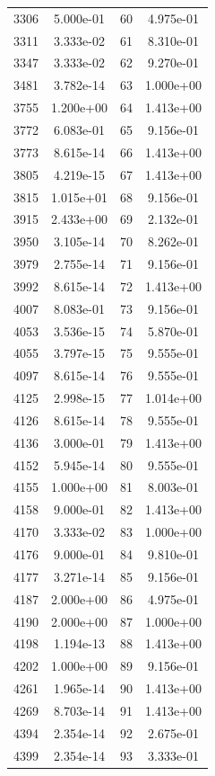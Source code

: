 \documentclass[12pt]{article}
\begin{document}
\begin{longtable}{@{}cccc@{}}
3306 & 5.000e-01 & 60 & 4.975e-01 \\
3311 & 3.333e-02 & 61 & 8.310e-01 \\
3347 & 3.333e-02 & 62 & 9.270e-01 \\
3481 & 3.782e-14 & 63 & 1.000e+00 \\
3755 & 1.200e+00 & 64 & 1.413e+00 \\
3772 & 6.083e-01 & 65 & 9.156e-01 \\
3773 & 8.615e-14 & 66 & 1.413e+00 \\
3805 & 4.219e-15 & 67 & 1.413e+00 \\
3815 & 1.015e+01 & 68 & 9.156e-01 \\
3915 & 2.433e+00 & 69 & 2.132e-01 \\
3950 & 3.105e-14 & 70 & 8.262e-01 \\
3979 & 2.755e-14 & 71 & 9.156e-01 \\
3992 & 8.615e-14 & 72 & 1.413e+00 \\
4007 & 8.083e-01 & 73 & 9.156e-01 \\
4053 & 3.536e-15 & 74 & 5.870e-01 \\
4055 & 3.797e-15 & 75 & 9.555e-01 \\
4097 & 8.615e-14 & 76 & 9.555e-01 \\
4125 & 2.998e-15 & 77 & 1.014e+00 \\
4126 & 8.615e-14 & 78 & 9.555e-01 \\
4136 & 3.000e-01 & 79 & 1.413e+00 \\
4152 & 5.945e-14 & 80 & 9.555e-01 \\
4155 & 1.000e+00 & 81 & 8.003e-01 \\
4158 & 9.000e-01 & 82 & 1.413e+00 \\
4170 & 3.333e-02 & 83 & 1.000e+00 \\
4176 & 9.000e-01 & 84 & 9.810e-01 \\
4177 & 3.271e-14 & 85 & 9.156e-01 \\
4187 & 2.000e+00 & 86 & 4.975e-01 \\
4190 & 2.000e+00 & 87 & 1.000e+00 \\
4198 & 1.194e-13 & 88 & 1.413e+00 \\
4202 & 1.000e+00 & 89 & 9.156e-01 \\
4261 & 1.965e-14 & 90 & 1.413e+00 \\
4269 & 8.703e-14 & 91 & 1.413e+00 \\
4394 & 2.354e-14 & 92 & 2.675e-01 \\
4399 & 2.354e-14 & 93 & 3.333e-01 \\

\end{longtable}
\end{document}
